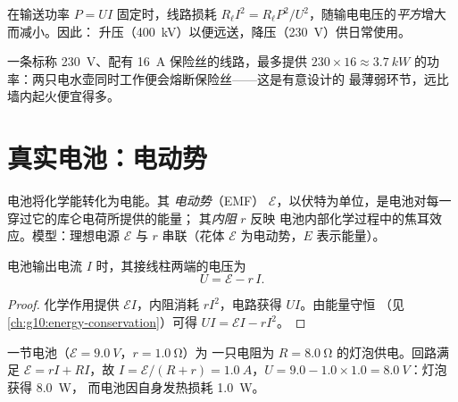 \begin{remark}[电网的铁律]\label{rem:g11:circuits-and-power:grid}
在输送功率 $P = UI$ 固定时，线路损耗 $R_\ell I^2 = R_\ell
P^2/U^2$，随输电电压的\emph{平方}增大而减小。因此：
升压（\qty{400}{kV}）以便远送，降压（\qty{230}{V}）供日常使用。
\end{remark}

\begin{remark}[家庭用电安全]\label{rem:g11:circuits-and-power:safety}
一条标称 \qty{230}{V}、配有 \qty{16}{A} 保险丝的线路，最多提供 $230 \times 16
\approx \qty{3.7}{kW}$ 的功率：两只电水壶同时工作便会熔断保险丝——这是有意设计的
最薄弱环节，远比墙内起火便宜得多。
\end{remark}

\section{真实电池：电动势}

\begin{definition}[电动势与内阻]\label{def:g11:circuits-and-power:emf}
电池将化学能转化为电能。其
\emph{电动势}（EMF）
$\mathcal{E}$，以伏特为单位，是电池对每一穿过它的库仑电荷所提供的能量；
其\emph{内阻} $r$ 反映
电池内部化学过程中的焦耳效应。模型：理想电源
$\mathcal{E}$ 与 $r$ 串联（花体 $\mathcal{E}$ 为电动势，$E$ 表示能量）。
\end{definition}

\begin{proposition}[端电压]\label{prop:g11:circuits-and-power:terminal}
电池输出电流 $I$ 时，其接线柱两端的电压为
\[ U = \mathcal{E} - r\,I . \]
\end{proposition}

\begin{proof}
化学作用提供 $\mathcal{E}I$，内阻消耗
$rI^2$，电路获得 $UI$。由能量守恒
（见\cref{ch:g10:energy-conservation}）可得 $UI = \mathcal{E}I - rI^2$。
\end{proof}

\begin{example}[负载下的电池]\label{ex:g11:circuits-and-power:discharge}
一节电池（$\mathcal{E} = \qty{9.0}{V}$，$r = \qty{1.0}{\ohm}$）为
一只电阻为 $R = \qty{8.0}{\ohm}$ 的灯泡供电。回路满足 $\mathcal{E} =
rI + RI$，故 $I = \mathcal{E}/(R + r) = \qty{1.0}{A}$，$U = 9.0 -
1.0 \times 1.0 = \qty{8.0}{V}$：灯泡获得 \qty{8.0}{W}，
而电池因自身发热损耗 \qty{1.0}{W}。
\end{example}

